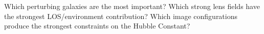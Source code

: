 Which perturbing galaxies are the most important? Which strong lens fields have the strongest LOS/environment contribution? Which image configurations produce the strongest constraints on the Hubble Constant?